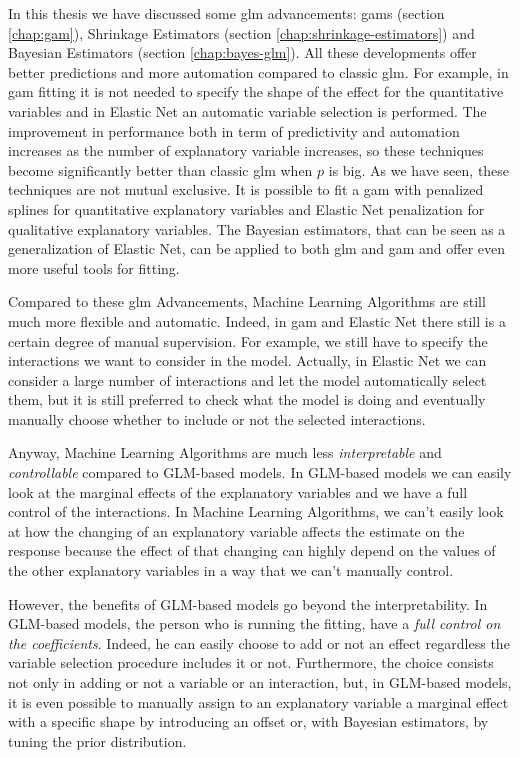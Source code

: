 \documentclass[a4paper, twoside, openright, 12pt]{report}
\theoremstyle{definition}
\theoremstyle{definition}
\theoremstyle{definition}
\theoremstyle{remark}
\begin{document}
In this thesis we have discussed some \ac{glm} advancements: \ac{gam}s (section \ref{chap:gam}), Shrinkage Estimators (section \ref{chap:shrinkage-estimators}) and Bayesian Estimators (section \ref{chap:bayes-glm}). All these developments offer better predictions and more automation compared to classic \ac{glm}. For example, in \ac{gam} fitting it is not needed to specify the shape of the effect for the quantitative variables and in Elastic Net an automatic variable selection is performed. The improvement in performance both in term of predictivity and automation increases as the number of explanatory variable increases, so these techniques become significantly better than classic \ac{glm} when \(p\) is big. As we have seen, these techniques are not mutual exclusive. It is possible to fit a \ac{gam} with penalized splines for quantitative explanatory variables and Elastic Net penalization for qualitative explanatory variables. The Bayesian estimators, that can be seen as a generalization of Elastic Net, can be applied to both \ac{glm} and \ac{gam} and offer even more useful tools for fitting.

Compared to these \ac{glm} Advancements, Machine Learning Algorithms are still much more flexible and automatic. Indeed, in \ac{gam} and Elastic Net there still is a certain degree of manual supervision. For example, we still have to specify the interactions we want to consider in the model. Actually, in Elastic Net we can consider a large number of interactions and let the model automatically select them, but it is still preferred to check what the model is doing and eventually manually choose whether to include or not the selected interactions.

Anyway, Machine Learning Algorithms are much less \emph{interpretable} and \emph{controllable} compared to GLM-based models. In GLM-based models we can easily look at the marginal effects of the explanatory variables and we have a full control of the interactions. In Machine Learning Algorithms, we can't easily look at how the changing of an explanatory variable affects the estimate on the response because the effect of that changing can highly depend on the values of the other explanatory variables in a way that we can't manually control.

However, the benefits of GLM-based models go beyond the interpretability. In GLM-based models, the person who is running the fitting, have a \emph{full control on the coefficients}. Indeed, he can easily choose to add or not an effect regardless the variable selection procedure includes it or not. Furthermore, the choice consists not only in adding or not a variable or an interaction, but, in GLM-based models, it is even possible to manually assign to an explanatory variable a marginal effect with a specific shape by introducing an offset or, with Bayesian estimators, by tuning the prior distribution.
\end{document}
